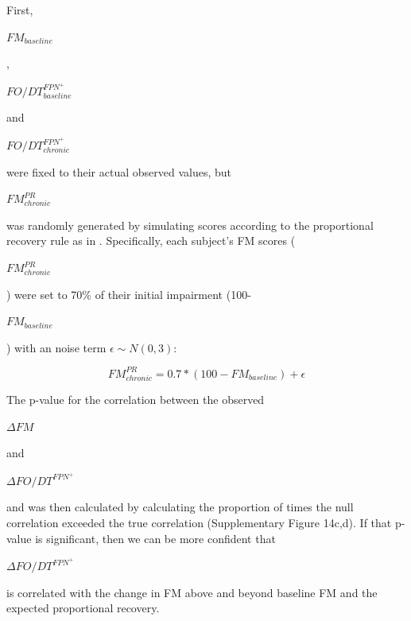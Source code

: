 \documentclass[phd,tocprelim]{cornell}
\begin{document}
     First, \begin{Large}$FM_{baseline}$\end{Large}, \begin{Large}$FO/DT^{FPN^+}_{baseline}$\end{Large}  and  \begin{Large}$FO/DT^{FPN^+}_{chronic}$\end{Large}  were fixed to their actual observed values, but  \begin{Large}$FM^{PR}_{chronic}$\end{Large}  was randomly generated by simulating scores according to the proportional recovery rule as in \cite{Kundert2019-ou}. Specifically, each subject's FM scores ( \begin{Large}$FM^{PR}_{chronic}$\end{Large} ) were set to 70$\%$ of their initial impairment (100- \begin{Large}$FM_{baseline}$\end{Large}) with an noise term $\epsilon \sim N(0,3)$:
   \begin{Large}
    \begin{equation}
        FM^{PR}_{chronic} = 0.7*(100-FM_{baseline}) + \epsilon
    \end{equation}
    \end{Large}
    The p-value for the correlation between the observed \begin{Large}$\Delta FM$\end{Large} and \begin{Large}$\Delta FO/DT^{FPN^+}$\end{Large} and was then calculated by calculating the proportion of times the null correlation exceeded the true correlation (Supplementary Figure 14c,d). If that p-value is significant, then we can be more confident that \begin{Large}$\Delta FO/DT^{FPN^+}$\end{Large} is correlated with the change in FM above and beyond baseline FM and the expected proportional recovery.
    
\end{document}
